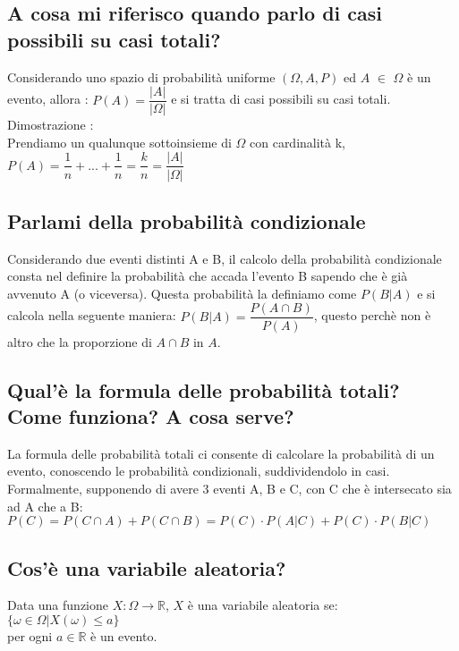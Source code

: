 \documentclass[a4paper,12pt]{report}
\begin{document}
	\subsection{A cosa mi riferisco quando parlo di casi possibili su casi totali?}
	Considerando uno spazio di probabilità uniforme $(\Omega, A, P)$ ed $A$ $\in$ $\Omega$ è un evento, allora : 
	$P(A) = \dfrac{|A|}{|\Omega|}$ e si tratta di casi possibili su casi totali.\\
	Dimostrazione : \\
	Prendiamo un qualunque sottoinsieme di $\Omega$ con cardinalità k, \\ $P(A) = \dfrac{1}{n} + ... + \dfrac{1}{n} = \dfrac{k}{n} = \dfrac{|A|}{|\Omega|}$
	\subsection{Parlami della probabilità condizionale}
	Considerando due eventi distinti A e B, il calcolo della probabilità condizionale consta nel definire la probabilità che accada l'evento B sapendo che è già avvenuto A (o viceversa). Questa probabilità la definiamo come $P(B|A)$ e si calcola nella seguente maniera: $P(B|A) = \dfrac{P(A \cap B)}{P(A)}$, questo perchè non è altro che la proporzione di $A \cap B$ in $A$.
	\subsection{Qual'è la formula delle probabilità totali? Come funziona? A cosa serve?}
	La formula delle probabilità totali ci consente di calcolare la probabilità di un evento, conoscendo le probabilità condizionali, suddividendolo in casi.
	Formalmente, supponendo di avere 3 eventi A, B e C, con C che è intersecato sia ad A che a B:
	$P(C) = P(C \cap A) + P(C \cap B) = P(C) \cdot P(A|C) + P(C) \cdot P(B|C)$
	\subsection{Cos'è una variabile aleatoria?}
	Data una funzione $X:\Omega \rightarrow \mathbb{R}$, $X$ è una variabile aleatoria se: \\ $\{\omega \in \Omega | X(\omega) \leq a\}$ \\ per ogni $a \in \mathbb{R}$ è un evento.
\end{document}
